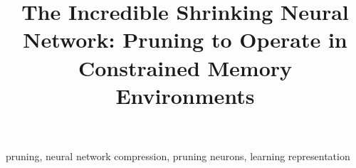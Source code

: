 \documentclass[wcp]{jmlr}
\title[The Incredible Shrinking Neural Network]{The Incredible Shrinking Neural Network: Pruning to Operate in Constrained Memory Environments}
\begin{document}
\maketitle


\begin{keywords}
pruning, neural network compression, pruning neurons, learning representation
\end{keywords}




%

%

%




%




%

%
%


\end{document}
